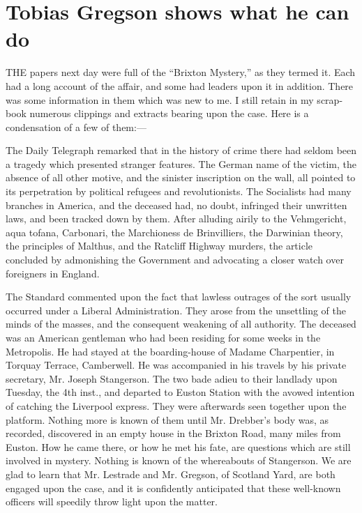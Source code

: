 \documentclass[12pt]{book}
\begin{document}
\chapter{Tobias Gregson shows what he can do} 

THE papers next day were full of the “Brixton Mystery,” as they termed it. Each had a long account of the affair, and some had leaders upon it in addition. There was some information in them which was new to me. I still retain in my scrap-book numerous clippings and extracts bearing upon the case. Here is a condensation of a few of them:— 

The Daily Telegraph remarked that in the history of crime there had seldom been a tragedy which presented stranger features. The German name of the victim, the absence of all other motive, and the sinister inscription on the wall, all pointed to its perpetration by political refugees and revolutionists. The Socialists had many branches in America, and the deceased had, no doubt, infringed their unwritten laws, and been tracked down by them. After alluding airily to the Vehmgericht, aqua tofana, Carbonari, the Marchioness de Brinvilliers, the Darwinian theory, the principles of Malthus, and the Ratcliff Highway murders, the article concluded by admonishing the Government and advocating a closer watch over foreigners in England. 

The Standard commented upon the fact that lawless outrages of the sort usually occurred under a Liberal Administration. They arose from the unsettling of the minds of the masses, and the consequent weakening of all authority. The deceased was an American gentleman who had been residing for some weeks in the Metropolis. He had stayed at the boarding-house of Madame Charpentier, in Torquay Terrace, Camberwell. He was accompanied in his travels by his private secretary, Mr. Joseph Stangerson. The two bade adieu to their landlady upon Tuesday, the 4th inst., and departed to Euston Station with the avowed intention of catching the Liverpool express. They were afterwards seen together upon the platform. Nothing more is known of them until Mr. Drebber’s body was, as recorded, discovered in an empty house in the Brixton Road, many miles from Euston. How he came there, or how he met his fate, are questions which are still involved in mystery. Nothing is known of the whereabouts of Stangerson. We are glad to learn that Mr. Lestrade and Mr. Gregson, of Scotland Yard, are both engaged upon the case, and it is confidently anticipated that these well-known officers will speedily throw light upon the matter. 
\end{document}
